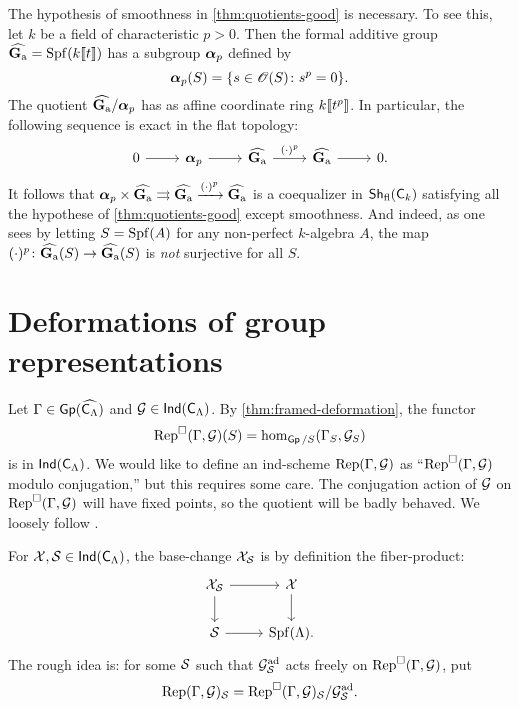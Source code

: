 \documentclass[phd,cornellheadings,draft]{cornell}
\begin{document}
\begin{example}
The hypothesis of smoothness in \ref{thm:quotients-good} is necessary. To see 
this, let $k$ be a field of characteristic $p>0$. Then the formal additive 
group $\widehat{\mathbf{G}_\mathrm{a}}=\operatorname{Spf}(k\llbracket t \rrbracket)$ has a subgroup ${\bm\alpha}_p$ defined by 
\[
  {\bm\alpha}_p(S) = \{s\in \mathscr{O}(S)\colon s^p=0\} .
\]
The quotient $\widehat{\mathbf{G}_\mathrm{a}}/{\bm\alpha}_p$ has as affine coordinate ring 
$k\llbracket t^p \rrbracket$. In particular, the following sequence is exact in the flat 
topology:
\[
\begin{tikzcd}
	0 \ar[r]
		& \balpha_p \ar[r]
		& \widehat\Ga \ar[r, "(\cdot)^p"]
		& \widehat\Ga \ar[r]
		& 0 .
\end{tikzcd}
\]
It follows that 
${\bm\alpha}_p\times \widehat{\mathbf{G}_\mathrm{a}}\rightrightarrows\widehat{\mathbf{G}_\mathrm{a}}\xrightarrow{(\cdot)^p} \widehat{\mathbf{G}_\mathrm{a}}$
is a coequalizer in $\operatorname{\mathsf{Sh}}_{\mathrm{fl}}(\mathsf{C}_k)$ satisfying all the hypothese 
of \ref{thm:quotients-good} except smoothness. And indeed, as one sees by 
letting $S=\operatorname{Spf}(A)$ for any non-perfect $k$-algebra $A$, the map 
$(\cdot)^p\colon \widehat{\mathbf{G}_\mathrm{a}}(S)\to \widehat{\mathbf{G}_\mathrm{a}}(S)$ is \emph{not} surjective for 
all $S$. 
\end{example}





\section{Deformations of group representations}

Let $\Gamma\in \operatorname{\mathsf{Gp}}(\widehat{\mathsf{C}_\Lambda})$ and $\mathcal{G}\in \operatorname{\mathsf{Ind}}(\mathsf{C}_\Lambda)$. By 
\ref{thm:framed-deformation}, the functor 
\[
  \operatorname{Rep}^\square(\Gamma,\mathcal{G})(S) = \hom_{\operatorname{\mathsf{Gp}}/S}(\Gamma_S,\mathcal{G}_S)
\]
is in $\operatorname{\mathsf{Ind}}(\mathsf{C}_\Lambda)$. We would like to define an ind-scheme 
$\operatorname{Rep}(\Gamma,\mathcal{G})$ as ``$\operatorname{Rep}^\square(\Gamma,\mathcal{G})$ modulo conjugation,'' but 
this requires some care. The conjugation action of $\mathcal{G}$ on 
$\operatorname{Rep}^\square(\Gamma,\mathcal{G})$ will have fixed points, so the quotient will be 
badly behaved. We loosely follow \cite{tilouine-1996}. 

For $\mathcal{X},\mathcal{S}\in \operatorname{\mathsf{Ind}}(\mathsf{C}_\Lambda)$, the base-change $\mathcal{X}_{\mathcal{S}}$ is by definition 
the fiber-product: 
\[
\begin{tikzcd}
	\cX_\cS \ar[r] \ar[d]
		& \cX \ar[d] \\
	\cS \ar[r]
		& \spf(\Lambda) .
\end{tikzcd}
\]
The rough idea is: for some $\mathcal{S}$ such that $\mathcal{G}^\mathrm{ad}_{\mathcal{S}}$ acts freely 
on $\operatorname{Rep}^\square(\Gamma,\mathcal{G})$, put 
\[
  \operatorname{Rep}(\Gamma,\mathcal{G})_{\mathcal{S}} = \operatorname{Rep}^\square(\Gamma,\mathcal{G})_{\mathcal{S}} / \mathcal{G}^\mathrm{ad}_{\mathcal{S}} .
\]
\end{document}

